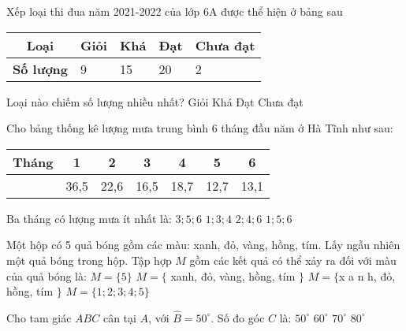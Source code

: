 \begin{ex}
	Xếp loại thi đua năm 2021-2022 của lớp 6A được thể hiện ở bảng sau
	\begin{center}
		\begin{tabular}{|c|*{4}{C{2cm}|}}
			\hline
			\textbf{Loại} & Giỏi & Khá & Đạt & Chưa đạt \\
			\hline
			\textbf{Số lượng} & 9 & 15 & 20 & 2 \\
			\hline
		\end{tabular}
	\end{center}
	Loại nào chiếm số lượng nhiều nhất?
	\choice
	{Giỏi}
	{Khá}
	{Đạt}
	{Chưa đạt}
	\loigiai{}
\end{ex}
\begin{ex}
	Cho bảng thống kê lượng mưa trung bình 6 tháng đầu năm ở Hà Tĩnh như sau:
	\begin{center}
		\begin{tabular}{|*{7}{c|}}
			\hline
			Tháng & 1 & 2 & 3 & 4 & 5 & 6 \\
			\hline
			\makecell[c]{Lượng mưa} & 36,5 & 22,6 & 16,5 & 18,7 & 12,7 & 13,1 \\
			\hline
		\end{tabular}
	\end{center}
	Ba tháng có lượng mưa ít nhất là:
	\choice
	{$3; 5; 6$}
	{$1; 3; 4$}
	{$2; 4; 6$}
	{$1; 5; 6$}
	\loigiai{}
\end{ex}
\begin{ex}
	\loigiai{}
\end{ex}
\begin{ex}
	Một hộp có 5 quả bóng gồm các màu: xanh, đỏ, vàng, hồng, tím. Lấy ngẫu nhiên một quả bóng trong hộp. Tập hợp $M$ gồm các kết quả có thể xảy ra đối với màu của quả bóng là:
	\choice
	{$M=\{5\}$}
	{$M=\{$ xanh, đỏ, vàng, hồng, tím $\}$}
	{$M=\{$x a n h, đỏ, hồng, tím $\}$}
	{$M=\{1; 2; 3; 4; 5\}$}
	\loigiai{}
\end{ex}
\begin{ex}
	Cho tam giác $ABC$ cân tại $A$, với $\widehat{B}=50^{\circ}$. Số đo góc $C$ là:
	\choice
	{$50^{\circ}$}
	{$60^{\circ}$}
	{$70^{\circ}$}
	{$80^{\circ}$}
	\loigiai{}
\end{ex}
